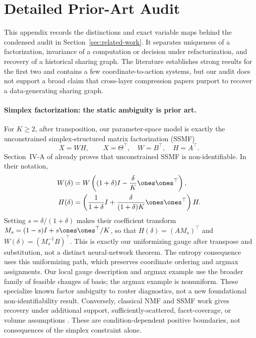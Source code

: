 \section{Detailed Prior-Art Audit}
\label{app:literature}

This appendix records the distinctions and exact variable maps behind the
condensed audit in Section~\ref{sec:related-work}.  It separates uniqueness of
a factorization, invariance of a computation or decision under
refactorization, and recovery of a historical sharing graph.  The literature
establishes strong results for the first two and contains a few
coordinate-to-action systems, but our audit does not support a broad claim
that cross-layer compression papers purport to recover a data-generating
sharing graph.

\paragraph{Simplex factorization: the static ambiguity is prior art.}
For \(K\ge 2\), after transposition, our parameter-space model is exactly the unconstrained
simplex-structured matrix factorization (SSMF)
\[
 X=WH,\qquad X=\Theta^\top,\quad W=B^\top,\quad H=A^\top.
\]
Section~IV-A of \citet{vuthanh2023bounded} already proves that unconstrained
SSMF is non-identifiable.  In their notation,
\begin{align*}
 W(\delta)&=W\left((1+\delta)I-\frac{\delta}{K}\ones\ones^\top\right),\\
 H(\delta)&=\left(\frac{1}{1+\delta}I+
 \frac{\delta}{(1+\delta)K}\ones\ones^\top\right)H.
\end{align*}
Setting $s=\delta/(1+\delta)$ makes their coefficient transform
$M_s=(1-s)I+s\ones\ones^\top/K$, so that
$H(\delta)=(AM_s)^\top$ and
$W(\delta)=(M_s^{-1}B)^\top$.  This is exactly our uniformizing gauge after
transpose and substitution, not a distinct neural-network theorem.  The entropy consequence uses this uniformizing path, which preserves
coordinate ordering and argmax assignments. Our local gauge description
and argmax example use the broader family of feasible changes of basis;
the argmax example is nonuniform. These specialize known factor ambiguity
to router diagnostics, not a new foundational non-identifiability result.  Conversely, classical NMF and SSMF
work gives recovery under additional support, sufficiently-scattered,
facet-coverage, or volume assumptions
\citep{donoho2003correct,fu2018identifiability,abdolali2021simplex,gillis2023partial}.
These are condition-dependent positive boundaries, not consequences of the
simplex constraint alone.

